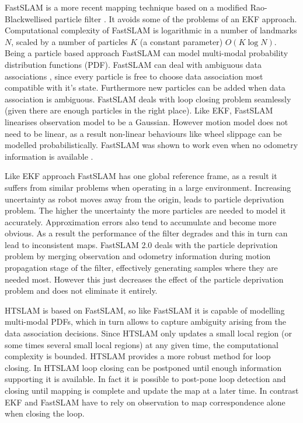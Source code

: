 
FastSLAM is a more recent mapping technique based on a modified
Rao-Blackwellised particle filter \cite{fastslam, fastslam2}. It
avoids some of the problems of an EKF approach. Computational
complexity of FastSLAM is logarithmic in a number of landmarks $N$,
scaled by a number of particles $K$ (a constant parameter) $O(K \log
N)$. Being a particle based approach FastSLAM can model multi-modal
probability distribution functions (PDF). FastSLAM can deal with
ambiguous data associations \cite{Montemerlo02d}, since every
particle is free to choose data association most compatible with it's
state. Furthermore new particles can be added when data association is
ambiguous. FastSLAM deals with loop closing problem seamlessly (given
there are enough particles in the right place). Like EKF, FastSLAM
linearises observation model to be a Gaussian. However motion model
does not need to be linear, as a result non-linear behaviours like
wheel slippage can be modelled probabilistically. FastSLAM was shown
to work even when no odometry information is available \cite{fastslam}.

Like EKF approach FastSLAM has one global reference frame, as a result
it suffers from similar problems when operating in a large
environment. Increasing uncertainty as robot moves away from the
origin, leads to particle deprivation problem. The higher the
uncertainty the more particles are needed to model it accurately.
Approximation errors also tend to accumulate and become more obvious.
As a result the performance of the filter degrades and this in turn
can lead to inconsistent maps. FastSLAM 2.0 \cite{fastslam2} deals
with the particle deprivation problem by merging observation and
odometry information during motion propagation stage of the filter,
effectively generating samples where they are needed most. However
this just decreases the effect of the particle deprivation problem and
does not eliminate it entirely.

HTSLAM is based on FastSLAM, so like FastSLAM it is capable of
modelling multi-modal PDFs, which in turn allows to capture ambiguity
arising from the data association decisions. Since HTSLAM only updates
a small local region (or some times several small local regions) at
any given time, the computational complexity is bounded. HTSLAM
provides a more robust method for loop closing. In HTSLAM loop closing
can be postponed until enough information supporting it is
available. In fact it is possible to post-pone loop detection and
closing until mapping is complete and update the map at a later
time. In contrast EKF and FastSLAM have to rely on observation to map
correspondence alone when closing the loop.

